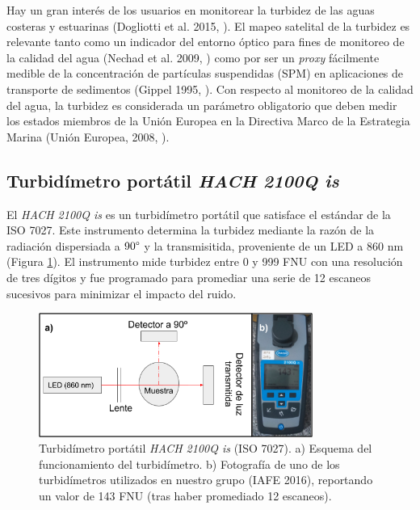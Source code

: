     Hay un gran interés de los usuarios en monitorear la turbidez de las aguas costeras y estuarinas (Dogliotti et al. 2015, \cite{dogliotti2015}). El mapeo satelital de la turbidez es relevante tanto como un indicador del entorno óptico para fines de monitoreo de la calidad del agua (Nechad et al. 2009, \cite{nechad2010}) como por ser un \textit{proxy} fácilmente medible de la concentración de partículas suspendidas (SPM) en aplicaciones de transporte de sedimentos (Gippel 1995, \cite{gippel1995}). Con respecto al monitoreo de la calidad del agua, la turbidez es considerada un parámetro obligatorio que deben medir los estados miembros de la Unión Europea en la Directiva Marco de la Estrategia Marina (Unión Europea, 2008, \cite{eu2008}).

    \subsection{Turbidímetro portátil \textit{HACH 2100Q is}}
    \label{dat:s:hach}

        El \textit{HACH 2100Q is} es un turbidímetro portátil que satisface el estándar de la ISO 7027. Este instrumento determina la turbidez mediante la razón de la radiación dispersiada a $90 \degree$ y la transmisitida, proveniente de un LED a 860 nm (Figura \ref{dat:HACH}). El instrumento mide turbidez entre 0 y 999 FNU con una resolución de tres dígitos y fue programado para promediar una serie de 12 escaneos sucesivos para minimizar el impacto del ruido.
        
        \begin{figure}
        \centering
        \includegraphics[width=0.8\textwidth]{dat/figures/HACH.png}
        \caption[Esquema y fotografía del turbidímetro portátil \textit{HACH 2100Q is} (ISO 7027).]{Turbidímetro portátil \textit{HACH 2100Q is} (ISO 7027). a) Esquema del funcionamiento del turbidímetro. b) Fotografía de uno de los turbidímetros utilizados en nuestro grupo (IAFE 2016), reportando un valor de 143 FNU (tras haber promediado 12 escaneos).}
        \label{dat:HACH}
        \end{figure}

